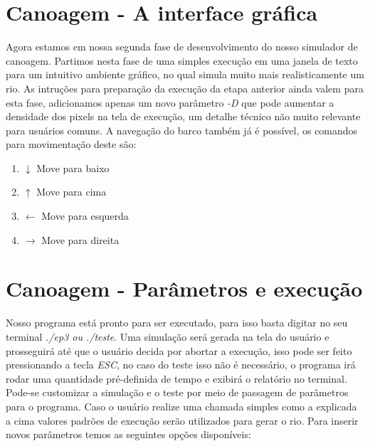 \documentclass[a4paper,11pt]{article}
\begin{document}
\section{Canoagem - A interface gráfica}
Agora estamos em nossa segunda fase de desenvolvimento do nosso simulador de canoagem. Partimos nesta fase de uma simples execução em uma janela de texto para um intuitivo ambiente gráfico, no qual simula muito mais realisticamente um rio. As intruções para preparação da execução da etapa anterior ainda valem para esta fase, adicionamos apenas um novo parâmetro \textit{-D} que pode aumentar a densidade dos pixels na tela de execução, um detalhe técnico não muito relevante para usuários comuns. A navegação do barco também já é possível, os comandos para movimentação deste são:

\begin{enumerate}
\item[]{ $\downarrow$ Move para baixo}
\item[]{ $\uparrow$ Move para cima}
\item[]{  $\leftarrow$ Move para esquerda}
\item[]{   $\rightarrow$ Move para direita}



\end{enumerate}


\section{Canoagem - Parâmetros e execu\c{c}ão}
Nosso programa está pronto para ser executado, para isso basta digitar no seu terminal \textit{./ep3 ou ./teste}. Uma simulação será gerada na tela do usuário e prosseguirá até que o usuário decida por abortar a execu\c{c}ão, isso pode ser feito pressionando a tecla \textit{ESC}, no caso do teste isso não é necessário, o programa irá rodar uma quantidade pré-definida de tempo e exibirá o relatório no terminal.
Pode-se customizar a simula\c{c}ão e o teste por meio de passagem de parâmetros para o programa. Caso o usuário realize uma chamada simples como a explicada a cima valores padrões de execu\c{c}ão serão utilizados para gerar o rio. Para inserir novos parâmetros temos as seguintes op\c{c}ões disponíveis:
\end{document}
